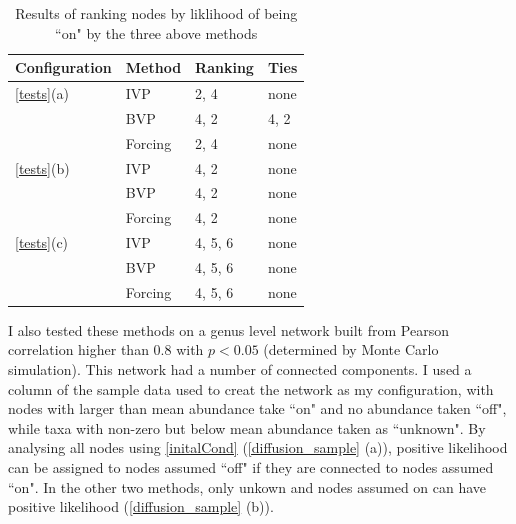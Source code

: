 \documentclass[10pt]{article}
\theoremstyle{definition}
\numberwithin{theorem}{section}
\numberwithin{definition}{section}
\numberwithin{lemma}{section}
\numberwithin{corollary}{section}
\numberwithin{clm}{section}
\numberwithin{rmk}{section}
\begin{document}
\begin{table}
	\begin{center}
\begin{tabular}{|l|l|l|l|}
	\hline Configuration & Method & Ranking & Ties\\
	\hline
	\cref{tests}(a) &  IVP & 2, 4 & none  \\ \cline{2-4}
	 & BVP & 4, 2 & 4, 2 \\ \cline{2-4}
	 & Forcing & 2, 4 & none \\
	\hline
		\cref{tests}(b) &  IVP & 4, 2 &none \\ \cline{2-4}
	& BVP &4, 2 & none  \\ \cline{2-4}
	& Forcing &4, 2 & none\\
	\hline
		\cref{tests}(c) &  IVP & 4, 5, 6& none \\ \cline{2-4}
	& BVP & 4, 5, 6&  none\\ \cline{2-4}
	& Forcing &  4, 5, 6& none \\
	\hline
\end{tabular}
\end{center}
\caption{Results of ranking nodes by liklihood of being ``on" by the three above methods}\label{rankres}
\end{table}
	
I also tested these methods on a genus level network built from Pearson correlation higher than $0.8$ with $p < 0.05$ (determined by Monte Carlo simulation). This network had a number of connected components. I used a column of the sample data used to creat the network as my configuration, with nodes with larger than mean abundance take ``on" and no abundance taken ``off", while taxa with non-zero but below mean abundance taken as ``unknown". By analysing all nodes using \cref{initalCond} (\cref{diffusion_sample} (a)), positive likelihood can be assigned to nodes assumed ``off" if they are connected to nodes assumed ``on". In the other two methods, only unkown and nodes assumed on can have positive likelihood (\cref{diffusion_sample} (b)).
\end{document}
